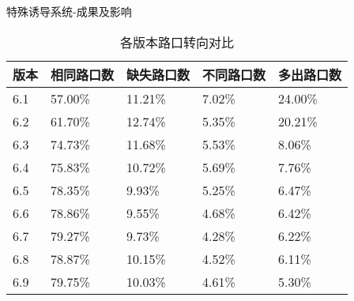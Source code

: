 \documentclass[10pt]{beamer}
\begin{document}
\begin{frame}{特殊诱导系统-成果及影响}
	\begin{table}
		\caption{各版本路口转向对比}
					\begin{tabularx}{0.9\textwidth}{X|X|X|X|X}
						\toprule 
						\footnotesize 版本 & \footnotesize 相同路口数 & \footnotesize 缺失路口数 & \footnotesize 不同路口数 & \footnotesize 多出路口数\\
						\midrule
						6.1 & 57.00\% & 11.21\% & 7.02\% & 24.00\%\\
						6.2 & 61.70\% & 12.74\% & 5.35\% & 20.21\%\\
						6.3 & 74.73\% & 11.68\% & 5.53\% & 8.06\%\\
						6.4 & 75.83\% & 10.72\% & 5.69\% & 7.76\%\\
						6.5 & 78.35\% & 9.93\% & 5.25\% & 6.47\%\\
						6.6 & 78.86\% & 9.55\% & 4.68\% & 6.42\%\\
						6.7 & 79.27\% & 9.73\% & 4.28\% & 6.22\%\\
						6.8 & 78.87\% & 10.15\% & 4.52\% & 6.11\%\\
						6.9 & 79.75\% & 10.03\% & 4.61\% & 5.30\%\\
						\bottomrule
					\end{tabularx}
	\end{table}      
\end{frame}
\end{document}
